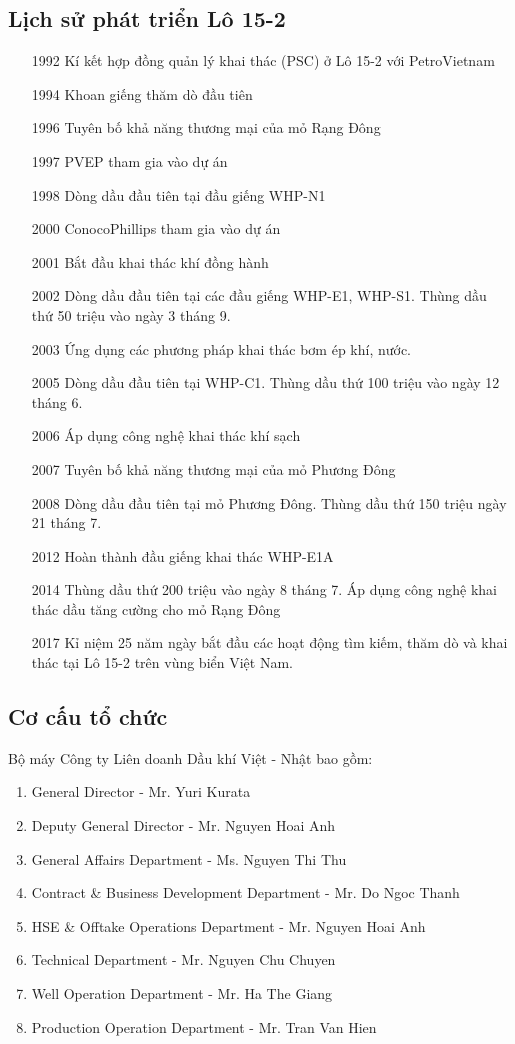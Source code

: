 \documentclass[12pt,a4paper]{report}
\begin{document}
\subsection{Lịch sử phát triển Lô 15-2}
	\begin{itemize}
    	\item[1992] Kí kết hợp đồng quản lý khai thác (PSC) ở Lô 15-2 với PetroVietnam
        \item[1994] Khoan giếng thăm dò đầu tiên
        \item[1996] Tuyên bố khả năng thương mại của mỏ Rạng Đông
        \item[1997] PVEP tham gia vào dự án
        \item[1998] Dòng dầu đầu tiên tại đầu giếng WHP-N1
        \item[2000] ConocoPhillips tham gia vào dự án
        \item[2001] Bắt đầu khai thác khí đồng hành
        \item[2002] Dòng dầu đầu tiên tại các đầu giếng WHP-E1, WHP-S1. Thùng dầu thứ 50 triệu vào ngày 3 tháng 9.
        \item[2003] Ứng dụng các phương pháp khai thác bơm ép khí, nước.
        \item[2005] Dòng dầu đầu tiên tại WHP-C1. Thùng dầu thứ 100 triệu vào ngày 12 tháng 6.
        \item[2006] Áp dụng công nghệ khai thác khí sạch
        \item[2007] Tuyên bố khả năng thương mại của mỏ Phương Đông
        \item[2008] Dòng dầu đầu tiên tại mỏ Phương Đông. Thùng dầu thứ 150 triệu ngày 21 tháng 7.
        \item[2012] Hoàn thành đầu giếng khai thác WHP-E1A
        \item[2014] Thùng dầu thứ 200 triệu vào ngày 8 tháng 7. Áp dụng công nghệ khai thác dầu tăng cường cho mỏ Rạng Đông
        \item[2017] Kỉ niệm 25 năm ngày bắt đầu các hoạt động tìm kiếm, thăm dò và khai thác tại Lô 15-2 trên vùng biển Việt Nam.
    \end{itemize}
\subsection{Cơ cấu tổ chức}
Bộ máy Công ty Liên doanh Dầu khí Việt - Nhật bao gồm:
	\begin{enumerate}
    	\item General Director - Mr. Yuri Kurata
        \item Deputy General Director - Mr. Nguyen Hoai Anh
        \item General Affairs Department - Ms. Nguyen Thi Thu
        \item Contract \& Business Development Department - Mr. Do Ngoc Thanh
        \item HSE \& Offtake Operations Department - Mr. Nguyen Hoai Anh
        \item Technical Department - Mr. Nguyen Chu Chuyen
        \item Well Operation Department - Mr. Ha The Giang
        \item Production Operation Department - Mr. Tran Van Hien
    \end{enumerate}
\end{document}
